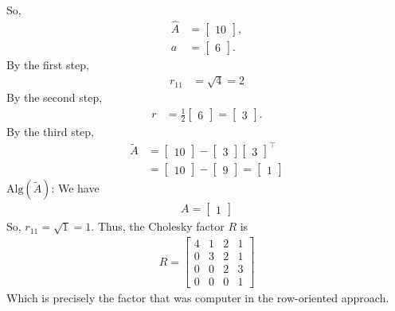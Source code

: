 \documentclass{report}
\begin{document}
    So,
    \begin{align*}
        \hat{A} &= \begin{bmatrix} 10 \end{bmatrix}, \\
        a &= \begin{bmatrix} 6 \end{bmatrix}
    .\end{align*}
    By the first step, 
    \begin{align*}
        r_{11} &= \sqrt{4} = 2
    \end{align*}
    By the second step, 
    \begin{align*}
        r &= \frac{1}{2}\begin{bmatrix}6 \end{bmatrix}  = \begin{bmatrix} 3 \end{bmatrix}
    .\end{align*}
    By the third step,
    \begin{align*}
        \tilde{A} &= \begin{bmatrix} 10\end{bmatrix} - \begin{bmatrix} 3 \end{bmatrix} \begin{bmatrix} 3 \end{bmatrix}^{\top} \\
                  &= \begin{bmatrix} 10 \end{bmatrix} - \begin{bmatrix} 9 \end{bmatrix} = \begin{bmatrix} 1 \end{bmatrix}
    \end{align*}
    $\text{Alg}(\tilde{A})$: We have 
    \begin{align*}
        A = \begin{bmatrix} 1 \end{bmatrix}
    \end{align*}
    So, $r_{11} = \sqrt{1} = 1$. Thus, the Cholesky factor $R $ is 
    \begin{align*}
        R = \begin{bmatrix}
            4 & 1 & 2 & 1 \\
            0 & 3 & 2 & 1  \\
            0 & 0 & 2 & 3 \\
            0 & 0 & 0 & 1
        \end{bmatrix}
    \end{align*}
    Which is precisely the factor that was computer in the row-oriented approach.
\end{document}
